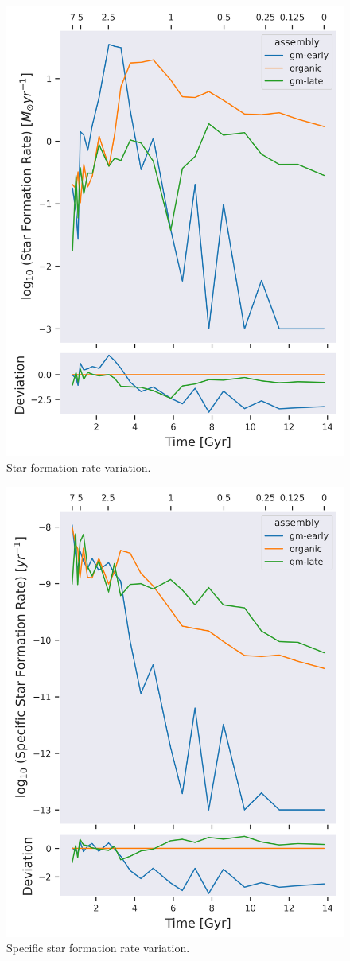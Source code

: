 \documentclass[twocolumn]{article}
\begin{document}
	\begin{figure}
			\centering 
			\includegraphics[width=\columnwidth]{./SFR.png}
			\caption{Star formation rate variation.}
	\end{figure}

	\begin{figure}
			\centering 
			\includegraphics[width=\columnwidth]{./sSFR.png}
			\caption{Specific star formation rate variation.}
	\end{figure}
\end{document}
